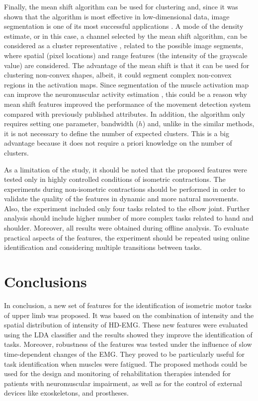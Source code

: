 Finally, the mean shift algorithm can be used for clustering and, since it was shown that the algorithm is most effective in low-dimensional data, image segmentation is one of its most successful applications \citep{Comaniciu2002}. A mode of the density estimate, or in this case, a channel selected by the mean shift algorithm, can be considered as a cluster representative \citep{Hennig2015}, related to the possible image segments, where spatial (pixel locations) and range features (the intensity of the grayscale value) are considered. The advantage of the mean shift is that it can be used for clustering non-convex shapes, albeit, it could segment complex non-convex regions in the activation maps. Since segmentation of the muscle activation map can improve the neuromuscular activity estimation \citep{Vieira2010}, this could be a reason why mean shift features improved the performance of the movement detection system compared with previously published attributes. In addition, the algorithm only requires setting one parameter, bandwidth ($h$) and, unlike in the similar methods, it is not necessary to define the number of expected clusters. This is a big advantage because it does not require a priori knowledge on the number of clusters.

As a limitation of the study, it should be noted that the proposed features were tested only in highly controlled conditions of isometric contractions. The experiments during non-isometric contractions should be performed in order to validate the quality of the features in dynamic and more natural movements. Also, the experiment included only four tasks related to the elbow joint. Further analysis should include higher number of more complex tasks related to hand and shoulder. Moreover, all results were obtained during offline analysis. To evaluate practical aspects of the features, the experiment should be repeated using online identification and considering multiple transitions between tasks.


\section{Conclusions} \label{sc:3-5}
In conclusion, a new set of features for the identification of isometric motor tasks of upper limb was proposed. It was based on the combination of intensity and the spatial distribution of intensity of HD-EMG. These new features were evaluated using the LDA classifier and the results showed they improve the identification of tasks. Moreover, robustness of the features was tested under the influence of slow time-dependent changes of the EMG. They proved to be particularly useful for task identification when muscles were fatigued. The proposed methods could be used for the design and monitoring of rehabilitation therapies intended for patients with neuromuscular impairment, as well as for the control of external devices like exoskeletons, and prostheses.


